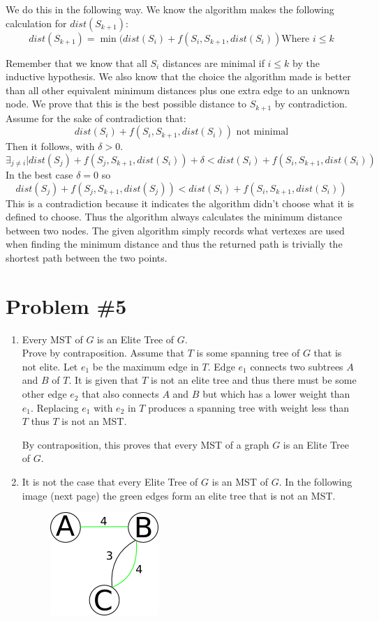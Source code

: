 \documentclass{article}
\begin{document}
We do this in the following way. We know the algorithm makes the following calculation for $dist(S_{k+1})$:
$$dist(S_{k+1}) = \min(dist(S_i) + f(S_i, S_{k+1}, dist(S_i))\text{Where }i\le k$$

Remember that we know that all $S_i$ distances are minimal if $i\le k$ by the inductive hypothesis. We also know that the choice the algorithm made is better than all other equivalent minimum distances plus one extra edge to an unknown node. We prove that this is the best possible distance to $S_{k+1}$ by contradiction.\\

Assume for the sake of contradiction that:
$$dist(S_i) + f(S_i, S_{k+1}, dist(S_i))\text{ not minimal}$$
Then it follows, with $\delta > 0$. 
$$\exists_{j\not= i}|dist(S_j) + f(S_j, S_{k+1}, dist(S_i)) + \delta < dist(S_i) + f(S_i, S_{k+1}, dist(S_i))$$
In the best case $\delta = 0$ so 
        $$dist(S_j) + f(S_j, S_{k+1}, dist(S_j)) < dist(S_i) + f(S_i, S_{k+1}, dist(S_i))$$
This is a contradiction because it indicates the algorithm didn't choose what it is defined to choose. Thus the algorithm always calculates the minimum distance between two nodes. The given algorithm simply records what vertexes are used when finding the minimum distance and thus the returned path is trivially the shortest path between the two points.

\section*{Problem \#5}
\begin{enumerate}
    \item Every MST of $G$ is an Elite Tree of $G$.\\
        Prove by contraposition. Assume that $T$ is some spanning tree of $G$ that is not elite. Let $e_1$ be the maximum edge in $T$. Edge $e_1$ connects two subtrees $A$ and $B$ of $T$. It is given that $T$ is not an elite tree and thus there must be some other edge $e_2$ that also connects $A$ and $B$ but which has a lower weight than $e_1$. Replacing $e_1$ with $e_2$ in $T$ produces a spanning tree with weight less than $T$ thus $T$ is not an MST.

        By contraposition, this proves that every MST of a graph $G$ is an Elite Tree of $G$.

    \item It is not the case that every Elite Tree of $G$ is an MST of $G$. In the following image (next page) the green edges form an elite tree that is not an MST.
    \begin{figure}[hb]
        \centering
        \includegraphics[scale=0.5]{eliteNotMST}
    \end{figure}
\end{enumerate}
\end{document}
